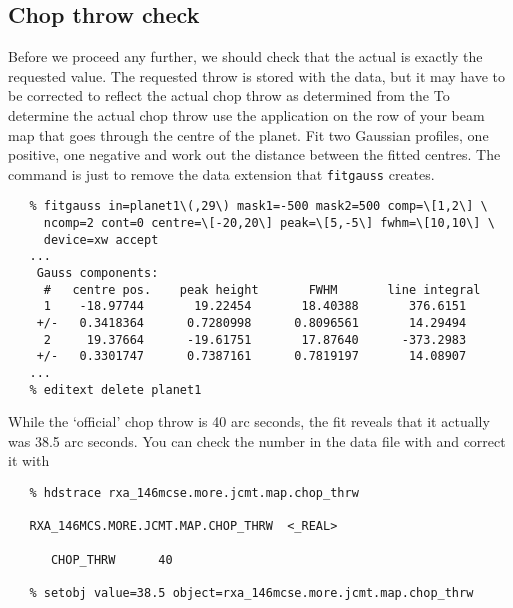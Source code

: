 \subsection{\label{throwchk}Chop throw check}

   Before we proceed any further, we should check that the actual
   is exactly the requested value. The requested throw is stored with
   the data, but it may have to be corrected to reflect the actual
   chop throw as determined from the
   To determine the actual chop throw use the application
{\tt {}}
   on the row of your beam map that goes through the centre of the
   planet. Fit two Gaussian profiles, one positive, one negative and
   work out the distance between the fitted centres. The
{\tt {}}
   command is just to remove the data extension that {\tt fitgauss}
   creates.

\begin{verbatim}
   % fitgauss in=planet1\(,29\) mask1=-500 mask2=500 comp=\[1,2\] \
     ncomp=2 cont=0 centre=\[-20,20\] peak=\[5,-5\] fwhm=\[10,10\] \
     device=xw accept
   ...
    Gauss components:
     #   centre pos.    peak height       FWHM       line integral
     1    -18.97744       19.22454       18.40388       376.6151
    +/-   0.3418364      0.7280998      0.8096561       14.29494
     2     19.37664      -19.61751       17.87640      -373.2983
    +/-   0.3301747      0.7387161      0.7819197       14.08907
   ...
   % editext delete planet1
\end{verbatim}

\begin{latexonly}
\begin{center}
\leavevmode\epsfysize=80mm
\end{center}
\end{latexonly}

   While the `official' chop throw is 40 arc seconds, the fit reveals that
   it actually was 38.5 arc seconds.
   You can check the number in the data file with
{\tt {}}
   and correct it with
{\tt {}}

\begin{verbatim}
   % hdstrace rxa_146mcse.more.jcmt.map.chop_thrw

   RXA_146MCS.MORE.JCMT.MAP.CHOP_THRW  <_REAL>

      CHOP_THRW      40

   % setobj value=38.5 object=rxa_146mcse.more.jcmt.map.chop_thrw
\end{verbatim}

